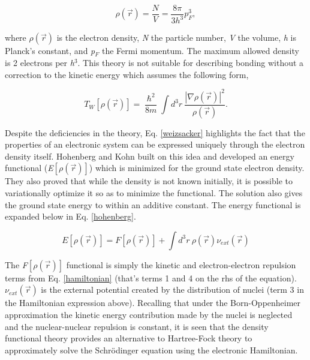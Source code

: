\begin{theory}
   \begin{equation}\label{thomasfermi}
       \rho(\vec{r}) = \frac{N}{V} = \frac{8\pi}{3h^{3}}p_{F}^{3},
   \end{equation}
  
  \noindent where $\rho(\vec{r})$ is the electron density, \emph{N} the particle number, \emph{V} the volume, 
  \emph{h} is Planck's constant, and \emph{p}$_{F}$ the Fermi momentum. The maximum allowed density is 2 
  electrons per \emph{h}$^{3}$. This theory is not suitable for describing bonding without a correction to the 
  kinetic energy which assumes the following form,
  
  \begin{equation}\label{weizsacker}
      T_{W}\left[\rho(\vec{r})\right] = \frac{\hslash^2}{8m} \int d^{3}r~ 
      \frac{\left|\nabla\rho(\vec{r})\right|^{2}}{\rho(\vec{r})}.
  \end{equation}
  
  \noindent Despite the deficiencies in the theory, Eq. \ref{weizsacker} highlights the fact that the properties
  of an electronic system can be expressed uniquely through the electron density itself. Hohenberg and Kohn built
  on this idea and developed an energy functional (\emph{E}$\left[\rho(\vec{r})\right]$) which is minimized for 
  the ground state electron density. They also proved that while the density is not known initially, it is possible 
  to variationally optimize it so as to minimize the functional. The solution also gives the ground state energy
  to within an additive constant. The energy functional is expanded below in Eq. \ref{hohenberg}.
  
  \begin{equation}\label{hohenberg}
      E\left[\rho(\vec{r})\right] = F\left[\rho(\vec{r})\right] + \int d^{3}r~ \rho(\vec{r})\nu_{ext}(\vec{r})
  \end{equation}
  
  The \emph{F}$\left[\rho(\vec{r})\right]$ functional is simply the kinetic and electron-electron repulsion terms
  from Eq. \ref{hamiltonian} (that's terms 1 and 4 on the rhs of the equation). $\nu_{ext}(\vec{r})$ is the 
  external potential created by the distribution of nuclei (term 3 in the Hamiltonian expression above). Recalling
  that under the Born-Oppenheimer approximation the kinetic energy contribution made by the nuclei is neglected
  and the nuclear-nuclear repulsion is constant, it is seen that the density functional theory provides an 
  alternative to Hartree-Fock theory to approximately solve the Schr\"{o}dinger equation using the electronic 
  Hamiltonian.
  

\end{theory}
